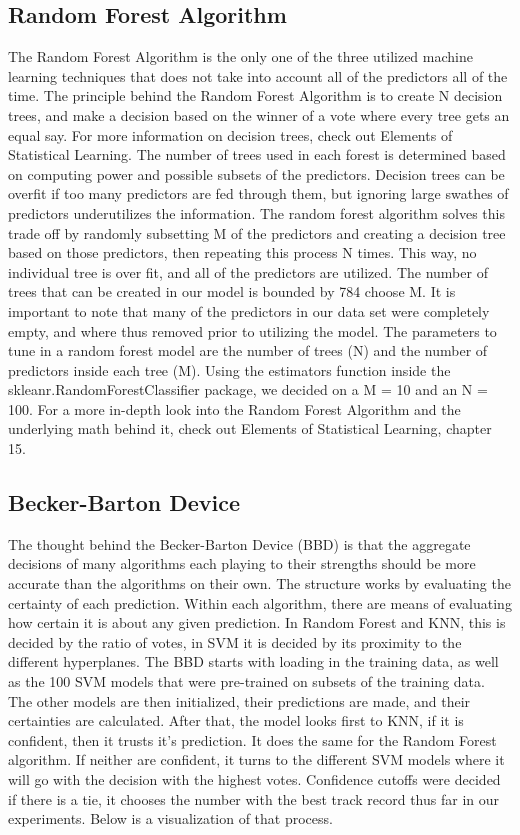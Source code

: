 \documentclass[11pt, oneside]{article}   	%
\begin{document}
\subsection{Random Forest Algorithm}
The Random Forest Algorithm is the only one of the three utilized machine learning techniques that does not take into account all of the predictors all of the time. The principle behind the Random Forest Algorithm is to create N decision trees, and make a decision based on the winner of a vote where every tree gets an equal say. For more information on decision trees, check out Elements of Statistical Learning. \cite{DecisionTree} The number of trees used in each forest is determined based on computing power and possible subsets of the predictors. Decision trees can be overfit if too many predictors are fed through them, but ignoring large swathes of predictors underutilizes the information. The random forest algorithm solves this trade off by randomly subsetting M of the predictors and creating a decision tree based on those predictors, then repeating this process N times. This way, no individual tree is over fit, and all of the predictors are utilized. The number of trees that can be created in our model is bounded by 784 choose M.  It is important to note that many of the predictors in our data set were completely empty, and where thus removed prior to utilizing the model. The parameters to tune in a random forest model are the number of trees (N) and the number of predictors inside each tree (M). Using the estimators function inside the skleanr.RandomForestClassifier package, we decided on a M = 10 and an N = 100. For a more in-depth look into the Random Forest Algorithm and the underlying math behind it, check out Elements of Statistical Learning, chapter 15. \cite{RandomForestBook}
\subsection{Becker-Barton Device}
The thought behind the Becker-Barton Device (BBD) is that the aggregate decisions of many algorithms each playing to their strengths should be more accurate than the algorithms on their own. The structure works by evaluating the certainty of each prediction. Within each algorithm, there are means of evaluating how certain it is about any given prediction. In Random Forest and KNN, this is decided by the ratio of votes, in SVM it is decided by its proximity to the different hyperplanes. The BBD starts with loading in the training data, as well as the 100 SVM models that were pre-trained on subsets of the training data. The other models are then initialized, their predictions are made, and their certainties are calculated. After that, the model looks first to KNN, if it is confident, then it trusts it's prediction. It does the same for the Random Forest algorithm. If neither are confident, it turns to the different SVM models where it will go with the decision with the highest votes. Confidence cutoffs were decided  if there is a tie, it chooses the number with the best track record thus far in our experiments. Below is a visualization of that process. 
\end{document}
